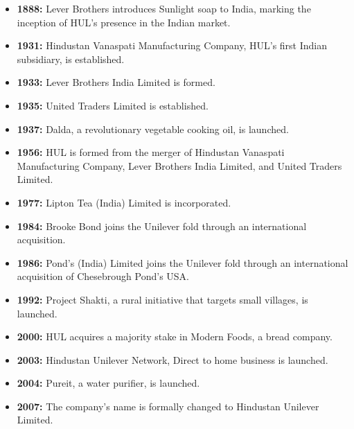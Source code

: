 \begin{itemize}
    \item \textbf{1888:} Lever Brothers introduces Sunlight soap to India, marking the inception of HUL's presence in the Indian market.
    
    \item \textbf{1931:} Hindustan Vanaspati Manufacturing Company, HUL's first Indian subsidiary, is established.
    
    \item \textbf{1933:} Lever Brothers India Limited is formed.
    
    \item \textbf{1935:} United Traders Limited is established.
    
    \item \textbf{1937:} Dalda, a revolutionary vegetable cooking oil, is launched.
    
    \item \textbf{1956:} HUL is formed from the merger of Hindustan Vanaspati Manufacturing Company, Lever Brothers India Limited, and United Traders Limited.
    
    \item \textbf{1977:} Lipton Tea (India) Limited is incorporated.
    
    \item \textbf{1984:} Brooke Bond joins the Unilever fold through an international acquisition.
    
    \item \textbf{1986:} Pond's (India) Limited joins the Unilever fold through an international acquisition of Chesebrough Pond's USA.
    
    \item \textbf{1992:} Project Shakti, a rural initiative that targets small villages, is launched.
    
    \item \textbf{2000:} HUL acquires a majority stake in Modern Foods, a bread company.
    
    \item \textbf{2003:} Hindustan Unilever Network, Direct to home business is launched.
    
    \item \textbf{2004:} Pureit, a water purifier, is launched.
    
    \item \textbf{2007:} The company's name is formally changed to Hindustan Unilever Limited.
    

\end{itemize}
